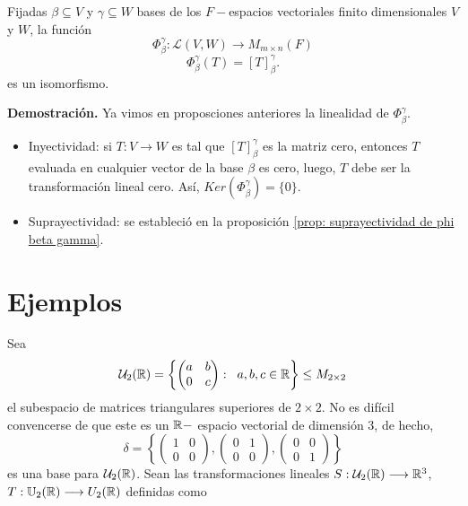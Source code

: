 \begin{prop}
Fijadas $\beta \subseteq V$ y $\gamma \subseteq W$ bases de los
$F-$espacios vectoriales finito dimensionales $V$ y $W$, 
la función 
\[
\Phi_{\beta}^{\gamma} : \mathcal{L}(V, W) \longrightarrow M_{m \times n}(F)
\]
\[
\Phi_{\beta}^{\gamma}(T) = [T]_{\beta}^{\gamma}.
\]
es un isomorfismo.
\end{prop}
\noindent
\textbf{Demostración.}
Ya vimos en proposciones anteriores la linealidad de 
$\Phi_{\beta}^{\gamma}$. 
\begin{itemize}
	\item Inyectividad: si $T: V \longrightarrow W$ es tal que
	$[T]_{\beta}^{\gamma}$ es la matriz cero, entonces $T$
	evaluada en cualquier vector de la base $\beta$ es cero, luego,
	$T$ debe ser la transformación lineal cero. Así,
	$Ker(\Phi_{\beta}^{\gamma}) = \{ 0 \}$.
	
	\item Suprayectividad: se estableció en la proposición 
	\ref{prop: suprayectividad de phi beta gamma}.
\end{itemize}

\QEDB
\vspace{0.2cm}

\section{Ejemplos}
Sea
\[
\mathcal{U}_{2}(\mathbb{R}) = \left\{
\begin{pmatrix}
a & b \\
0 & c
\end{pmatrix}: \hspace{0.2cm}
a, b, c \in \mathbb{R}
\right\} \leq M_{2 \times 2}
\]
el subespacio de matrices triangulares superiores de $2 \times 2$.
No es difícil convencerse de que este es un $\mathbb{R}-$ espacio vectorial
de dimensión $3$, de hecho,
\[
\delta = \left\{
\begin{pmatrix}
1 & 0 \\
0 & 0
\end{pmatrix}, 
\begin{pmatrix}
0 & 1 \\
0 & 0
\end{pmatrix}, 
\begin{pmatrix}
0 & 0 \\
0 & 1
\end{pmatrix}
\right\}
\]
es una base para $\mathcal{U}_{2}(\mathbb{R})$.
Sean las transformaciones lineales
$S : \mathcal{U}_{2}(\mathbb{R}) \longrightarrow \mathbb{R}^{3}$,
$T: \mathbb{U}_{2}(\mathbb{R}) \longrightarrow U_{2}(\mathbb{R})$
definidas como

